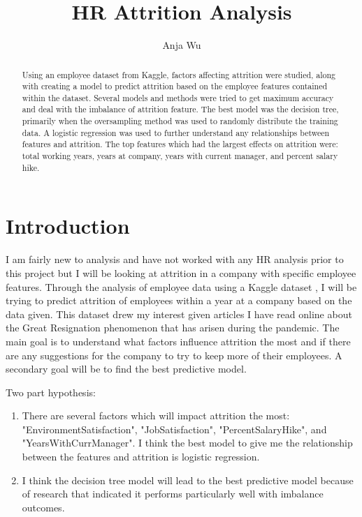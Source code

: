 \documentclass{article}
\title{HR Attrition Analysis}
\author{
  Anja Wu \\
  \vspace{-15mm} 
}
\begin{document}
\maketitle

\begin{abstract}
\vspace{-2mm} 
  Using an employee dataset from Kaggle, factors affecting attrition were studied, along with creating a model to predict attrition based on the employee features contained within the dataset. Several models and methods were tried to get maximum accuracy and deal with the imbalance of attrition feature. The best model was the decision tree, primarily when the oversampling method was used to randomly distribute the training data. A logistic regression was used to further understand any relationships between features and attrition. The top features which had the largest effects on attrition were: total working years, years at company, years with current manager, and percent salary hike.
  \vspace{-3mm} 
\end{abstract}





\section{Introduction}
\vspace{-2mm} 
I am fairly new to analysis and have not worked with any HR analysis prior to this project but I will be looking at attrition in a company with specific employee features. Through the analysis of employee data using a Kaggle dataset \cite{kaggledata}, I will be trying to predict attrition of employees within a year at a company based on the data given. This dataset drew my interest given articles I have read online about the Great Resignation phenomenon that has arisen during the pandemic. The main goal is to understand what factors influence attrition the most and if there are any suggestions for the company to try to keep more of their employees. A secondary goal will be to find the best predictive model.

Two part hypothesis:
\begin{enumerate}[leftmargin=0.5cm]
\item There are several factors which will impact attrition the most: "EnvironmentSatisfaction", "JobSatisfaction", "PercentSalaryHike", and "YearsWithCurrManager". I think the best model to give me the relationship between the features and attrition is logistic regression. 
\item I think the decision tree model will lead to the best predictive model because of research that indicated it performs particularly well with imbalance outcomes. 
\end{enumerate}
\end{document}
